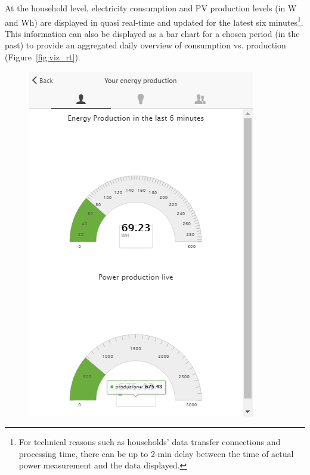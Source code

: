 At the household level, electricity consumption and PV production levels (in W and Wh) are displayed in quasi real-time and updated for the latest six minutes\footnote{For technical reasons such as households' data transfer connections and processing time, there can be up to 2-min delay between the time of actual power measurement and the data displayed.}.
This information can also be displayed as a bar chart for a chosen period (in the past) to provide an aggregated daily overview of consumption vs. production (Figure~\ref{fig:viz_rt}). 
% 
\begin{figure}
      \begin{center}
        \begin{minipage}[htb]{0.43\linewidth}    
        \includegraphics[width=1\linewidth]{img/visual_production.png}

\end{minipage}
\end{center}
\end{figure}

